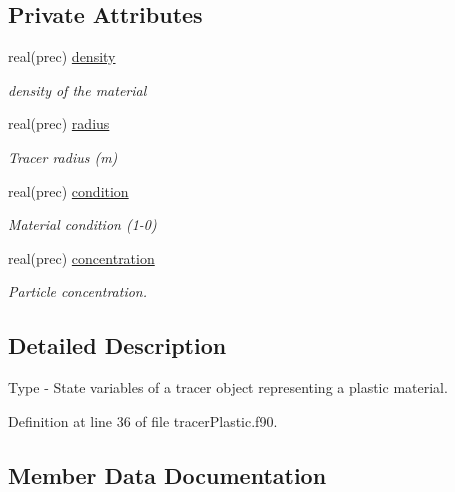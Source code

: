 \subsection*{Private Attributes}
\begin{DoxyCompactItemize}
\item 
real(prec) \mbox{\hyperlink{structtracerplastic__mod_1_1plastic__state__class_aa3cc141bbe8b1bf06f439e335c5477db}{density}}
\begin{DoxyCompactList}\small\item\em density of the material \end{DoxyCompactList}\item 
real(prec) \mbox{\hyperlink{structtracerplastic__mod_1_1plastic__state__class_adcabfc8dd732395f9721677448baf4c0}{radius}}
\begin{DoxyCompactList}\small\item\em Tracer radius (m) \end{DoxyCompactList}\item 
real(prec) \mbox{\hyperlink{structtracerplastic__mod_1_1plastic__state__class_ad97fc611c4c04bc78fa396b1bcc4c20a}{condition}}
\begin{DoxyCompactList}\small\item\em Material condition (1-\/0) \end{DoxyCompactList}\item 
real(prec) \mbox{\hyperlink{structtracerplastic__mod_1_1plastic__state__class_a90a24749c122f418f54c66f0b5d6a2e7}{concentration}}
\begin{DoxyCompactList}\small\item\em Particle concentration. \end{DoxyCompactList}\end{DoxyCompactItemize}


\subsection{Detailed Description}
Type -\/ State variables of a tracer object representing a plastic material. 

Definition at line 36 of file tracer\+Plastic.\+f90.



\subsection{Member Data Documentation}
\mbox{\label{structtracerplastic__mod_1_1plastic__state__class_a90a24749c122f418f54c66f0b5d6a2e7}} 
